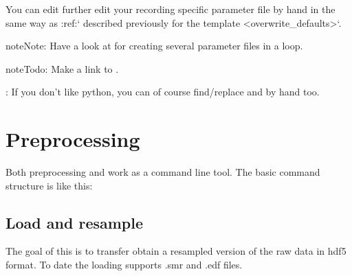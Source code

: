 \documentclass[letterpaper,10pt,english]{sphinxmanual}
\begin{document}
You can edit further edit your recording specific parameter file by hand in the same way as :ref:{}` described previously for the template \textless{}overwrite\_defaults\textgreater{}{}`.

\begin{sphinxadmonition}{note}{Note:}
Have a look at  for creating several parameter files
in a loop.
\end{sphinxadmonition}

\begin{sphinxadmonition}{note}{\label{setting_parameters:index-0}Todo:}
Make a link to .
\end{sphinxadmonition}

: If you don’t like python, you can of course find/replace  and  by hand too.


\chapter{Preprocessing}
\label{\detokenize{preprocessing:preprocessing}}\label{\detokenize{preprocessing:id1}}\label{\detokenize{preprocessing::doc}}
Both preprocessing and {\hyperref[\detokenize{LFP_to_bursts:lfp-to-bursts}]{}} work as a command line tool. The basic command structure is like this:

%
\begin{sphinxVerbatim}[commandchars=\\\{\}]
   
\end{sphinxVerbatim}


\section{Load and resample}
\label{\detokenize{preprocessing:load-and-resample}}\label{\detokenize{preprocessing:resample}}
The goal of this is to transfer obtain a resampled version of the raw data in hdf5 format. To date the loading supports
.smr and .edf files.
\end{document}
